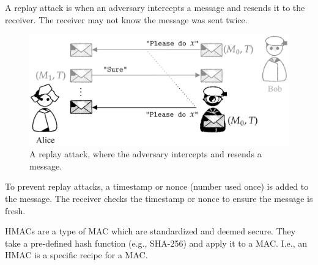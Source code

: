\begin{theo}

    \label{theo:replay_attack}
    A replay attack is when an adversary intercepts a message and resends it to the receiver. The receiver may not know the message was sent twice.
\end{theo}

\begin{figure}[h!]
    \centering
    \includegraphics[width=.8\textwidth]{Sections/sec/enc/replay.png}
    \caption{A replay attack, where the adversary intercepts and resends a message.}
    \label{fig:block_cipher}
\end{figure}

\begin{theo}

    \label{theo:replay_attack_prevention}
    To prevent replay attacks, a timestamp or nonce (number used once) is added to the message. The receiver checks the timestamp or nonce to ensure the message is fresh.
\end{theo}

\newpage 

\begin{Def}

    \label{theo:hmac}
    HMACs are a type of MAC which are standardized and deemed secure. They take a pre-defined 
    hash function (e.g., SHA-256) and apply it to a MAC. I.e., an HMAC is a specific recipe for a MAC. \hfill \cite{seth2013macvsHMAC}
\end{Def}

